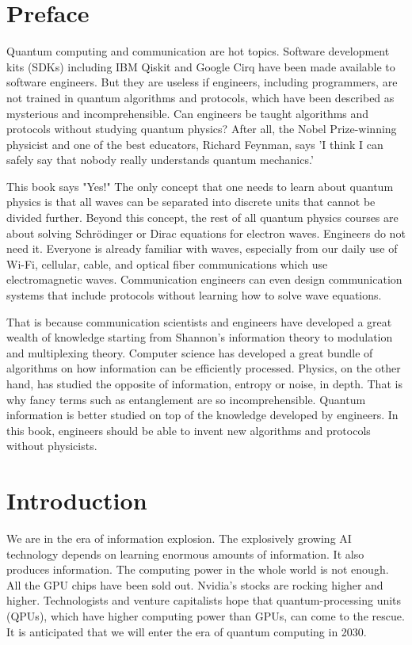 \documentclass[oneside, letter, 12pt]{book}
\begin{document}



\chapter*{Preface}
Quantum computing and communication are hot topics. Software development kits (SDKs) including IBM Qiskit and Google Cirq have been made available to software engineers. But they are useless if engineers, including programmers, are not trained in quantum algorithms and protocols, which have been described as mysterious and incomprehensible. Can engineers be taught algorithms and protocols without studying quantum physics? After all, the Nobel Prize-winning physicist and one of the best educators, Richard Feynman, says 'I think I can safely say that nobody really understands quantum mechanics.'

This book says "Yes!" The only concept that one needs to learn about quantum physics is that all waves can be separated into discrete units that cannot be divided further. Beyond this concept, the rest of all quantum physics courses are about solving Schrödinger or Dirac equations for electron waves. Engineers do not need it. Everyone is already familiar with waves, especially from our daily use of Wi-Fi, cellular, cable, and optical fiber communications which use electromagnetic waves. Communication engineers can even design communication systems that include protocols without learning how to solve wave equations.

That is because communication scientists and engineers have developed a great wealth of knowledge starting from Shannon's information theory to modulation and multiplexing theory. Computer science has developed a great bundle of algorithms on how information can be efficiently processed. Physics, on the other hand, has studied the opposite of information, entropy or noise, in depth. That is why fancy terms such as entanglement are so incomprehensible. Quantum information is better studied on top of the knowledge developed by engineers. In this book, engineers should be able to invent new algorithms and protocols without physicists.

\setcounter{tocdepth}{3}
\tableofcontents

\mainmatter

\chapter{Introduction}\label{c-intro}
We are in the era of information explosion. The explosively growing AI technology depends on learning enormous amounts of information. It also produces information. The computing power in the whole world is not enough. All the GPU chips have been sold out. Nvidia's stocks are rocking higher and higher. Technologists and venture capitalists hope that quantum-processing units (QPUs), which have higher computing power than GPUs, can come to the rescue. It is anticipated that we will enter the era of quantum computing in 2030.
\end{document}
